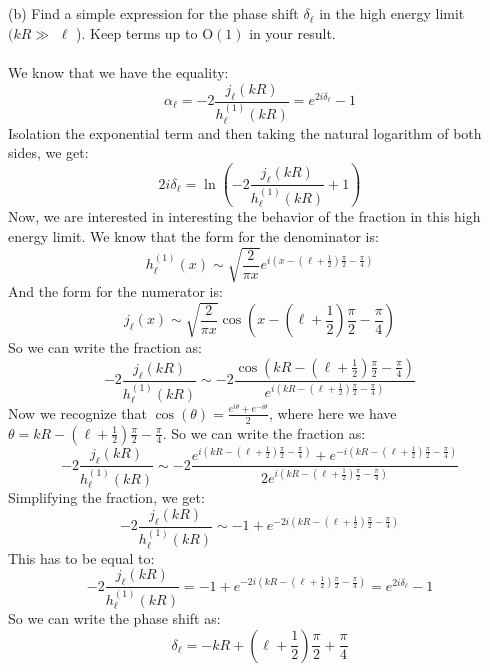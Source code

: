 \documentclass[12pt]{article}
\begin{document}
\subsection{}
(b) Find a simple expression for the phase shift $\delta_{\ell}$ in the high energy limit $(k R \gg$ $\ell$ ). Keep terms up to $\mathrm{O}(1)$ in your result.\\\\
We know that we have the equality:
\begin{equation}
\alpha_{\ell}=-2 \frac{j_{\ell}(k R)}{h_{\ell}^{(1)}(k R)} = e^{2 i \delta_{\ell}}-1
\end{equation}
Isolation the exponential term and then taking the natural logarithm of both sides, we get:
\begin{equation}
2 i \delta_{\ell} = \ln \left( -2 \frac{j_{\ell}(k R)}{h_{\ell}^{(1)}(k R)} + 1 \right)
\end{equation}
Now, we are interested in interesting the behavior of the fraction in this high energy limit. We know that the form for the denominator is:
\begin{equation}
h_{\ell}^{(1)}(x) \sim \sqrt{\frac{2}{\pi x}} e^{i\left(x-(\ell+\frac{1}{2}) \frac{\pi}{2}-\frac{\pi}{4}\right)}
\end{equation}
And the form for the numerator is:
\begin{equation}
j_{\ell}(x) \sim \sqrt{\frac{2}{\pi x}} \cos \left(x-(\ell + \frac{1}{2})\frac{\pi }{2}-\frac{\pi}{4}\right)
\end{equation}
So we can write the fraction as:
\begin{equation}
-2 \frac{j_{\ell}(k R)}{h_{\ell}^{(1)}(k R)} \sim -2 \frac{\cos \left(k R-(\ell + \frac{1}{2})\frac{\pi }{2}-\frac{\pi}{4}\right)}{e^{i\left(k R-(\ell + \frac{1}{2})\frac{\pi }{2}-\frac{\pi}{4}\right)}}
\end{equation}
Now we recognize that $\cos(\theta ) = \frac{e^{i\theta}+e^{-i\theta}}{2}$, where here we have $\theta = k R-(\ell + \frac{1}{2})\frac{\pi }{2}-\frac{\pi}{4}$. So we can write the fraction as:
\begin{equation}
-2 \frac{j_{\ell}(k R)}{h_{\ell}^{(1)}(k R)} \sim -2 \frac{e^{i\left(k R-(\ell + \frac{1}{2})\frac{\pi }{2}-\frac{\pi}{4}\right)}+e^{-i\left(k R-(\ell + \frac{1}{2})\frac{\pi }{2}-\frac{\pi}{4}\right)}}{2e^{i\left(k R-(\ell + \frac{1}{2})\frac{\pi }{2}-\frac{\pi}{4}\right)}}
\end{equation}
Simplifying the fraction, we get:
\begin{equation}
-2 \frac{j_{\ell}(k R)}{h_{\ell}^{(1)}(k R)} \sim -1 + e^{-2i\left(k R-(\ell + \frac{1}{2})\frac{\pi }{2}-\frac{\pi}{4}\right)}
\end{equation}
This has to be equal to:
\begin{equation}
-2 \frac{j_{\ell}(k R)}{h_{\ell}^{(1)}(k R)} = -1 + e^{-2i\left(k R-(\ell + \frac{1}{2})\frac{\pi }{2}-\frac{\pi}{4}\right)} = e^{2 i \delta_{\ell}}-1
\end{equation}
So we can write the phase shift as:
\begin{equation}
\delta_{\ell} = -k R+(\ell + \frac{1}{2})\frac{\pi }{2}+\frac{\pi}{4}
\end{equation}
\end{document}
